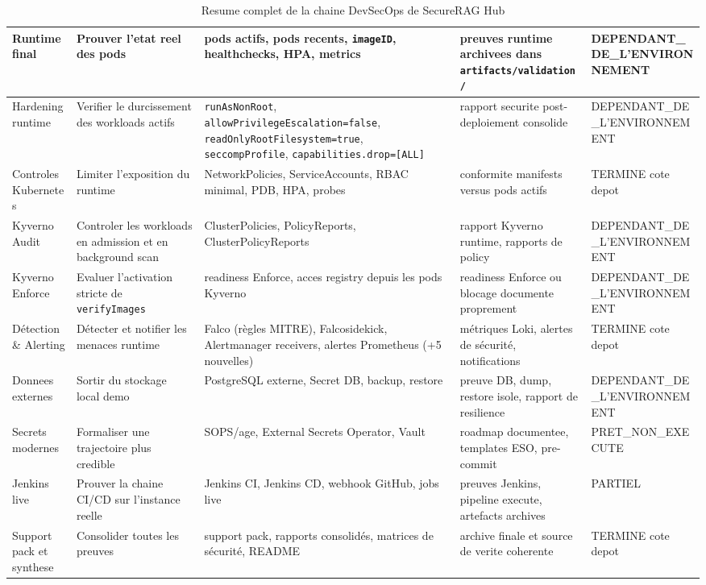 \begin{table}[h]
\begin{tabular}{|p{2.2cm}|p{2.9cm}|p{4.0cm}|p{2.3cm}|p{2.4cm}|}
\hline
Runtime final & Prouver l'etat reel des pods & pods actifs, pods recents, \texttt{imageID}, healthchecks, HPA, metrics & preuves runtime archivees dans \texttt{artifacts/validation/} & DEPENDANT\_DE\_L'ENVIRONNEMENT \\
\hline
Hardening runtime & Verifier le durcissement des workloads actifs & \texttt{runAsNonRoot}, \texttt{allowPrivilegeEscalation=false}, \texttt{readOnlyRootFilesystem=true}, \texttt{seccompProfile}, \texttt{capabilities.drop=[ALL]} & rapport securite post-deploiement consolide & DEPENDANT\_DE\_L'ENVIRONNEMENT \\
\hline
Controles Kubernetes & Limiter l'exposition du runtime & NetworkPolicies, ServiceAccounts, RBAC minimal, PDB, HPA, probes & conformite manifests versus pods actifs & TERMINE cote depot \\
\hline
Kyverno Audit & Controler les workloads en admission et en background scan & ClusterPolicies, PolicyReports, ClusterPolicyReports & rapport Kyverno runtime, rapports de policy & DEPENDANT\_DE\_L'ENVIRONNEMENT \\
\hline
Kyverno Enforce & Evaluer l'activation stricte de \texttt{verifyImages} & readiness Enforce, acces registry depuis les pods Kyverno & readiness Enforce ou blocage documente proprement & DEPENDANT\_DE\_L'ENVIRONNEMENT \\
\hline
Détection \& Alerting & Détecter et notifier les menaces runtime & Falco (règles MITRE), Falcosidekick, Alertmanager receivers, alertes Prometheus (+5 nouvelles) & métriques Loki, alertes de sécurité, notifications & TERMINE cote depot \\
\hline
Donnees externes & Sortir du stockage local demo & PostgreSQL externe, Secret DB, backup, restore & preuve DB, dump, restore isole, rapport de resilience & DEPENDANT\_DE\_L'ENVIRONNEMENT \\
\hline
Secrets modernes & Formaliser une trajectoire plus credible & SOPS/age, External Secrets Operator, Vault & roadmap documentee, templates ESO, pre-commit & PRET\_NON\_EXECUTE \\
\hline
Jenkins live & Prouver la chaine CI/CD sur l'instance reelle & Jenkins CI, Jenkins CD, webhook GitHub, jobs live & preuves Jenkins, pipeline execute, artefacts archives & PARTIEL \\
\hline
Support pack et synthese & Consolider toutes les preuves & support pack, rapports consolidés, matrices de sécurité, README & archive finale et source de verite coherente & TERMINE cote depot \\
\hline
\end{tabular}
\caption{Resume complet de la chaine DevSecOps de SecureRAG Hub}
\label{tab:chaine-devsecops-complete}
\end{table}

